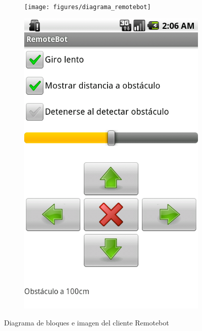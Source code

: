 \begin{figure}
    \centering
    \begin{subfigure}[b]{0.78\textwidth}
        \texttt{[image: figures/diagrama\_remotebot]}
        \label{fig:diagrama_remotebot}
    \end{subfigure}
    \begin{subfigure}[b]{0.2\textwidth}
        \centering
        \includegraphics[width=\textwidth]{figures/cliente_remotebot}
        \label{fig:cliente_remotebot}
    \end{subfigure}
    \caption{Diagrama de bloques e imagen del cliente Remotebot}
    \label{fig:diagrama_y_cliente_remotebot}
\end{figure}

